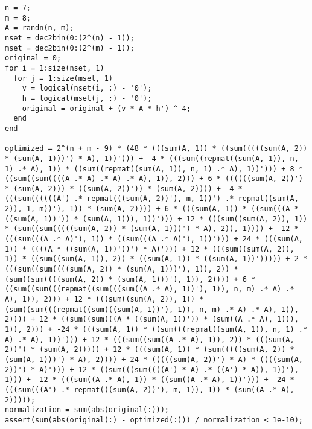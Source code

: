 \begin{lstlisting}
n = 7;
m = 8;
A = randn(n, m);
nset = dec2bin(0:(2^(n) - 1));
mset = dec2bin(0:(2^(m) - 1));
original = 0;
for i = 1:size(nset, 1)
  for j = 1:size(mset, 1)
    v = logical(nset(i, :) - '0');
    h = logical(mset(j, :) - '0');
    original = original + (v * A * h') ^ 4;
  end
end

optimized = 2^(n + m - 9) * (48 * (((sum(A, 1)) * ((sum(((((sum(A, 2)) * (sum(A, 1)))') * A), 1))'))) + -4 * (((sum((repmat((sum(A, 1)), n, 1) .* A), 1)) * ((sum((repmat((sum(A, 1)), n, 1) .* A), 1))'))) + 8 * ((sum((sum((((A .* A) .* A) .* A), 1)), 2))) + 6 * ((((((sum(A, 2))') * (sum(A, 2))) * ((sum(A, 2))')) * (sum(A, 2)))) + -4 * (((sum((((((A') .* repmat(((sum(A, 2))'), m, 1))') .* repmat((sum(A, 2)), 1, m))'), 1)) * (sum(A, 2)))) + 6 * (((sum(A, 1)) * ((sum(((A * ((sum(A, 1))')) * (sum(A, 1))), 1))'))) + 12 * (((sum((sum(A, 2)), 1)) * (sum((sum(((((sum(A, 2)) * (sum(A, 1)))') * A), 2)), 1)))) + -12 * (((sum(((A .* A)'), 1)) * ((sum(((A .* A)'), 1))'))) + 24 * (((sum(A, 1)) * ((((A * ((sum(A, 1))'))') * A)'))) + 12 * (((sum((sum(A, 2)), 1)) * ((sum((sum(A, 1)), 2)) * ((sum(A, 1)) * ((sum(A, 1))'))))) + 2 * (((sum((sum((((sum(A, 2)) * (sum(A, 1)))'), 1)), 2)) * (sum((sum((((sum(A, 2)) * (sum(A, 1)))'), 1)), 2)))) + 6 * ((sum((sum(((repmat((sum(((sum((A .* A), 1))'), 1)), n, m) .* A) .* A), 1)), 2))) + 12 * (((sum((sum(A, 2)), 1)) * (sum((sum(((repmat((sum(((sum(A, 1))'), 1)), n, m) .* A) .* A), 1)), 2)))) + 12 * ((sum((sum(((A * ((sum(A, 1))')) * (sum((A .* A), 1))), 1)), 2))) + -24 * (((sum(A, 1)) * ((sum(((repmat((sum(A, 1)), n, 1) .* A) .* A), 1))'))) + 12 * (((sum((sum((A .* A), 1)), 2)) * (((sum(A, 2))') * (sum(A, 2))))) + 12 * (((sum(A, 1)) * (sum(((((sum(A, 2)) * (sum(A, 1)))') * A), 2)))) + 24 * (((((sum(A, 2))') * A) * ((((sum(A, 2))') * A)'))) + 12 * ((sum(((sum((((A') * A) .* ((A') * A)), 1))'), 1))) + -12 * (((sum((A .* A), 1)) * ((sum((A .* A), 1))'))) + -24 * (((sum(((A') .* repmat(((sum(A, 2))'), m, 1)), 1)) * (sum((A .* A), 2)))));
normalization = sum(abs(original(:)));
assert(sum(abs(original(:) - optimized(:))) / normalization < 1e-10);
\end{lstlisting}
